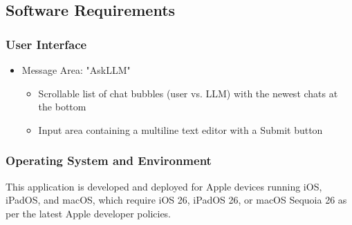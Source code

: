 \documentclass[11pt]{article}
\begin{document}
\subsection{Software Requirements}
\subsubsection{User Interface}
\begin{itemize}
    \item Message Area: "AskLLM"
    \begin{itemize}
        \item Scrollable list of chat bubbles (user vs. LLM) with the newest chats at the bottom
        \item Input area containing a multiline text editor with a Submit button
    \end{itemize}
\end{itemize}

\subsubsection{Operating System and Environment}
This application is developed and deployed for Apple devices running iOS, iPadOS, and macOS, which require iOS 26, iPadOS 26, or macOS Sequoia 26 as per the latest Apple developer policies.

\end{document}
